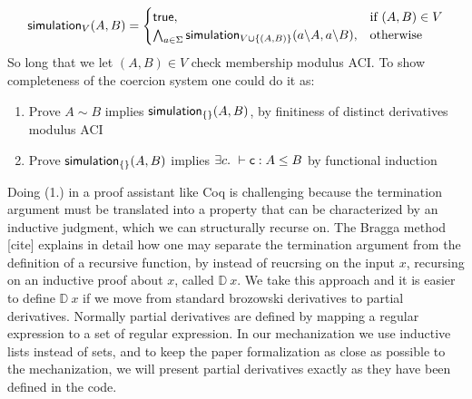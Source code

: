 \begin{align}
\mathsf{simulation}_{V}(A,B) =\begin{cases}
			\mathsf{true}, & \text{if }(A,B) \in V\\
                      \bigwedge_{a \in \Sigma}\mathsf{simulation}_{V \cup \{(A,B)\}}(a \backslash A,a \backslash B), & \text{otherwise}
		 \end{cases}
\end{align}
So long that we let $(A,B) \in V$ check membership modulus ACI. To show completeness of the coercion system one could do it as:
\begin{enumerate}
\item Prove $A \sim B$ implies $\mathsf{simulation}_{\{\}}(A,B)$, by finitiness of distinct derivatives modulus ACI
\item Prove $\mathsf{simulation}_{\{\}}(A,B)$ implies $\exists c.~\vdash \mathsf{c} : A \leq B$ by functional induction
\end{enumerate}
Doing (1.) in a proof assistant like Coq is challenging because the termination argument must be translated into a property that can be characterized by an inductive judgment, which we can structurally recurse on. The Bragga method [cite] explains in detail how one may separate the termination argument from the definition of a recursive function, by instead of reucrsing on the input $x$, recursing on an inductive proof about $x$, called $\mathbb{D}~x$. We take this approach and it is easier to define $\mathbb{D}~x$ if we move from standard brozowski derivatives to partial derivatives. Normally partial derivatives are defined by mapping a regular expression to a set of regular expression. In our mechanization we use inductive lists instead of sets, and to keep the paper formalization as close as possible to the mechanization, we will present partial derivatives exactly as they have been defined in the code.\\
